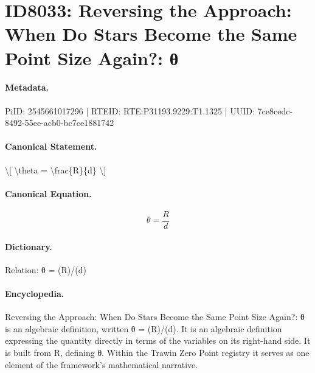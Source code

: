 \section*{ID8033: Reversing the Approach: When Do Stars Become the Same Point Size Again?: θ}
\paragraph{Metadata.}
PiID: 2545661017296 | RTEID: RTE:P31193.9229:T1.1325 | UUID: 7ce8cedc-8492-55ee-acb0-bc7ce1881742

\paragraph{Canonical Statement.}
\textbackslash{}[ \textbackslash{}theta = \textbackslash{}frac\{R\}\{d\} \textbackslash{}]

\paragraph{Canonical Equation.}
\[
\theta = \frac{R}{d}
\]

\paragraph{Dictionary.}
Relation: θ = (R)/(d)

\paragraph{Encyclopedia.}
Reversing the Approach: When Do Stars Become the Same Point Size Again?: θ is an algebraic definition, written θ = (R)/(d). It is an algebraic definition expressing the quantity directly in terms of the variables on its right-hand side. It is built from R, defining θ. Within the Trawin Zero Point registry it serves as one element of the framework's mathematical narrative.
